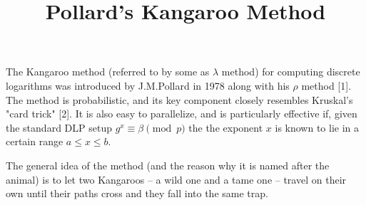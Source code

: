 \documentclass{article}
\title{Pollard's Kangaroo Method}
\begin{document}
    \maketitle

    The Kangaroo method (referred to by some as $\lambda$ method) for computing discrete logarithms was introduced by J.M.Pollard in 1978 along with his $\rho$ method [1]. The method is probabilistic, and its key component closely resembles Kruskal's "card trick" [2]. It is also easy to parallelize, and is particularly effective if, given the standard DLP setup $g^x \equiv \beta \pmod{p}$ the the exponent $x$ is known to lie in a certain range $a \leq x \leq b$.

    The general idea of the method (and the reason why it is named after the animal) is to let two Kangaroos -- a wild one and a tame one -- travel on their own until their paths cross and they fall into the same trap.
\end{document}

